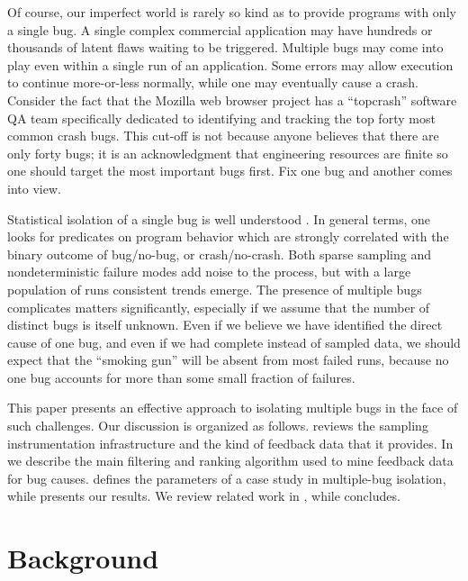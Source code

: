 \documentclass{sig-alternate}
\begin{document}
Of course, our imperfect world is rarely so kind as to provide
programs with only a single bug.  A single complex commercial
application may have hundreds or thousands of latent flaws waiting to
be triggered.  Multiple bugs may come into play even within a single
run of an application.  Some errors may allow execution to continue
more-or-less normally, while one may eventually cause a crash.
Consider the fact that the Mozilla web browser project has a
``topcrash'' software QA team specifically dedicated to identifying
and tracking the top forty most common crash bugs.  This cut-off is
not because anyone believes that there are only forty bugs; it is an
acknowledgment that engineering resources are finite so one should
target the most important bugs first.  Fix one bug and another comes
into view.

Statistical isolation of a single bug is well understood
\cite{Zheng:2003:SDSP}.  In general terms, one looks for predicates on
program behavior which are strongly correlated with the binary outcome
of bug/no-bug, or crash/no-crash.  Both sparse sampling and
nondeterministic failure modes add noise to the process, but with a
large population of runs consistent trends emerge.  The presence of
multiple bugs complicates matters significantly, especially if we
assume that the number of distinct bugs is itself unknown.  Even if we
believe we have identified the direct cause of one bug, and even if we
had complete instead of sampled data, we should expect that the
``smoking gun'' will be absent from most failed runs, because no one
bug accounts for more than some small fraction of failures.

This paper presents an effective approach to isolating multiple bugs
in the face of such challenges.  Our discussion is organized as
follows.   reviews the sampling
instrumentation infrastructure and the kind of feedback data that it
provides.  In  we describe the main filtering
and ranking algorithm used to mine feedback data for bug causes.
 defines the parameters of a case study
in multiple-bug isolation, while 
presents our results.  We review related work in
, while  concludes.

\section{Background}
\label{sec:background}
\end{document}
